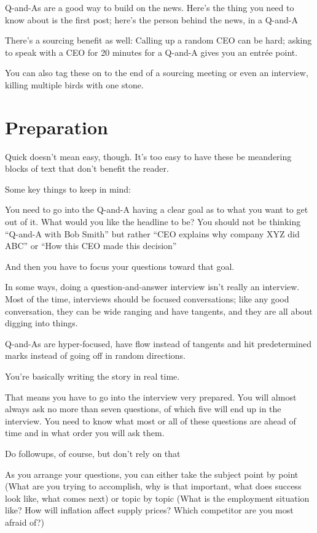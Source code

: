 \documentclass[
  11pt,
  american,
  letterpaperpaper,
  extrafontsizes,onecolumn,openright
  ]{memoir}
\begin{document}
Q-and-As are a good way to build on the news. Here's the thing you need to know about is the first post; here's the person behind the news, in a Q-and-A

There's a sourcing benefit as well: Calling up a random CEO can be hard; asking to speak with a CEO for 20 minutes for a Q-and-A gives you an entrée point.

You can also tag these on to the end of a sourcing meeting or even an interview, killing multiple birds with one stone.

\hypertarget{preparation}{%
\section*{Preparation}\label{preparation}}

Quick doesn't mean easy, though. It's too easy to have these be meandering blocks of text that don't benefit the reader.

Some key things to keep in mind:

You need to go into the Q-and-A having a clear goal as to what you want to get out of it. What would you like the headline to be? You should not be thinking \enquote{Q-and-A with Bob Smith} but rather \enquote{CEO explains why company XYZ did ABC} or \enquote{How this CEO made this decision}

And then you have to focus your questions toward that goal.

In some ways, doing a question-and-answer interview isn't really an interview. Most of the time, interviews should be focused conversations; like any good conversation, they can be wide ranging and have tangents, and they are all about digging into things.

Q-and-As are hyper-focused, have flow instead of tangents and hit predetermined marks instead of going off in random directions.

You're basically writing the story in real time.

That means you have to go into the interview very prepared. You will almost always ask no more than seven questions, of which five will end up in the interview. You need to know what most or all of these questions are ahead of time and in what order you will ask them.

Do followups, of course, but don't rely on that

As you arrange your questions, you can either take the subject point by point (What are you trying to accomplish, why is that important, what does success look like, what comes next) or topic by topic (What is the employment situation like? How will inflation affect supply prices? Which competitor are you most afraid of?)
\end{document}

